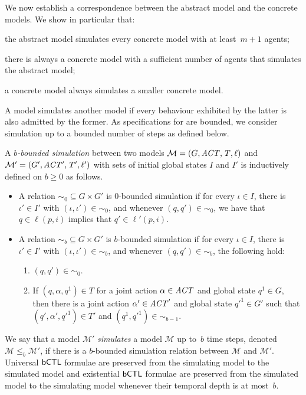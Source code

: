 We now establish a correspondence between the abstract model and the concrete
models. We show in particular that: 
\begin{inparaenum}[\it (i)]
\item the abstract model simulates every concrete model with at least~$m+1$
  agents;
\item there is always a concrete model with a sufficient number of agents that
  simulates the abstract model;
\item a concrete model always simulates a smaller concrete model.
\end{inparaenum}
A model simulates another
model if every behaviour exhibited by the latter is also admitted by the former.
As specifications for \panos{} are bounded, we consider simulation up to a bounded
number of steps as defined below.

\begin{definition}
  A \emph{$b$-bounded simulation} between two models
  $\mathcal M = \left ( G, \it{ACT}, T, \ell \right )$ and
  $\mathcal{M'} = \left ( G', \it{ACT'}, T', \ell' \right )$ with
    sets of initial global states
  $I$ and $I'$ is inductively defined on $b \geq 0$ as follows.
  \begin{itemize}[$\bullet$]
  \item A relation $\sim_0 \subseteq G \times G'$ is $0$-bounded simulation if
    for every $\iota \in I$, there is $\iota' \in I'$ with
          $(\iota, \iota') \in \sim_0$, and whenever $(q, q') \in \sim_0$, we have
    that $q \in \ell(p,i)$ implies that $q' \in \ell'(p, i)$.
  \item A relation $\sim_b \subseteq G \times G'$ is $b$-bounded simulation if
       for every $\iota \in I$, there is $\iota' \in I'$ with
          $(\iota, \iota') \in \sim_b$, and whenever $(q, q') \in \sim_b$, the
    following hold:
    \begin{enumerate}[1.]
    \item $(q, q') \in \sim_0$.
    \item If $(q, \alpha, q^1) \in T$ for a joint action $\alpha \in \it{ACT}$
      and global state $q^1 \in G$, then there is a joint action
      $\alpha' \in \it{ACT}'$ and global state $q'^1 \in G'$ such that
      $(q', \alpha', q'^1) \in T'$ and $(q^1, q'^1) \in \sim_{b - 1}$.
    \end{enumerate}
  \end{itemize}
\end{definition}

We say that a model $\mathcal{M'}$ \emph{simulates} a model $\mathcal M$ up
to~$b$ time steps, denoted $\mathcal M \leq_b \mathcal{M'}$, if there is a
$b$-bounded simulation relation between $\mathcal M$ and $\mathcal{M'}$.
Universal $\sf{bCTL}$ formulae are preserved from the simulating model to the
simulated model and existential $\sf{bCTL}$ formulae are preserved from the
simulated model to the simulating model whenever their temporal depth is at
most~$b$.

